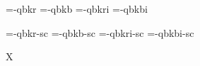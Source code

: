 

\ifx\sizespec\undefined \def\sizespec{}\fi
\ifx\font\corkencoded {}\else {}\fi

\ifx\font\unicoded  {} 
\else

\font\tenrm=\tmp-qbkr  \sizespec
\font\tenbf=\tmp-qbkb  \sizespec
\font\tenit=\tmp-qbkri \sizespec
\font\tenbi=\tmp-qbkbi \sizespec

\font\tenrmc=\tmp-qbkr-sc  \sizespec
\font\tenbfc=\tmp-qbkb-sc  \sizespec
\font\tenitc=\tmp-qbkri-sc \sizespec
\font\tenbic=\tmp-qbkbi-sc \sizespec

\fi

\tenrm

\def\caps#1{{\escapechar=-1 \expandafter}%
  \expandafter\csname\expandafter\tenonlytext\string#1c\endcsname}
\def\tenonlytext{ten}

\ifx\font\corkencoded\else \ifx\font\unicoded\else  \fi\fi
\ifx\mathpreloaded X\else  \fi                     


